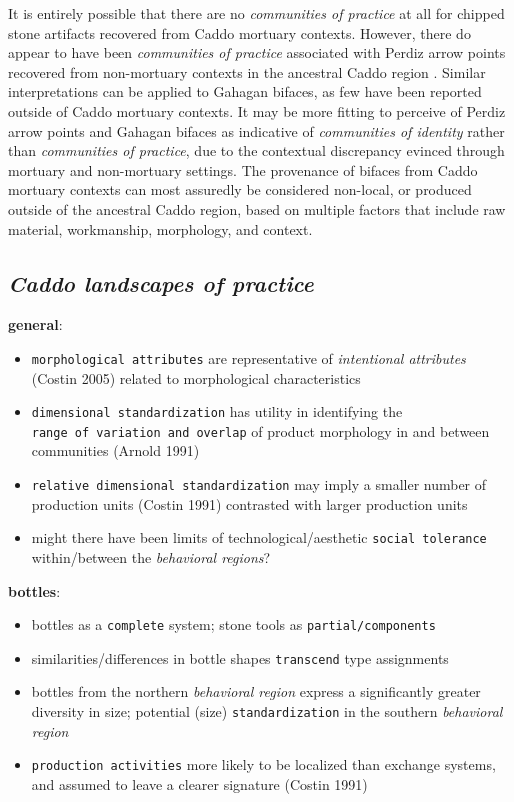 \documentclass[smallextended]{svjour3}       %
\begin{document}
It is entirely possible that there are no \emph{communities of practice}
at all for chipped stone artifacts recovered from Caddo mortuary
contexts. However, there do appear to have been \emph{communities of
practice} associated with Perdiz arrow points recovered from
non-mortuary contexts in the ancestral Caddo region \cite{RN9364}.
Similar interpretations can be applied to Gahagan bifaces, as few have
been reported outside of Caddo mortuary contexts. It may be more fitting
to perceive of Perdiz arrow points and Gahagan bifaces as indicative of
\emph{communities of identity} rather than \emph{communities of
practice}, due to the contextual discrepancy evinced through mortuary
and non-mortuary settings. The provenance of bifaces from Caddo mortuary
contexts can most assuredly be considered non-local, or produced outside
of the ancestral Caddo region, based on multiple factors that include
raw material, workmanship, morphology, and context.

\hypertarget{caddo-landscapes-of-practice}{%
\subsection{\texorpdfstring{\emph{Caddo landscapes of
practice}}{Caddo landscapes of practice}}\label{caddo-landscapes-of-practice}}

\textbf{general}:

\begin{itemize}
\item
  \texttt{morphological\ attributes} are representative of
  \emph{intentional attributes} (Costin 2005) related to morphological
  characteristics
\item
  \texttt{dimensional\ standardization} has utility in identifying the
  \texttt{range\ of\ variation\ and\ overlap} of product morphology in
  and between communities (Arnold 1991)
\item
  \texttt{relative\ dimensional\ standardization} may imply a smaller
  number of production units (Costin 1991) contrasted with larger
  production units
\item
  might there have been limits of technological/aesthetic
  \texttt{social\ tolerance} within/between the \emph{behavioral
  regions}?
\end{itemize}

\textbf{bottles}:

\begin{itemize}
\item
  bottles as a \texttt{complete} system; stone tools as
  \texttt{partial/components}
\item
  similarities/differences in bottle shapes \texttt{transcend} type
  assignments
\item
  bottles from the northern \emph{behavioral region} express a
  significantly greater diversity in size; potential (size)
  \texttt{standardization} in the southern \emph{behavioral region}
\item
  \texttt{production\ activities} more likely to be localized than
  exchange systems, and assumed to leave a clearer signature (Costin
  1991)
\end{itemize}
\end{document}
